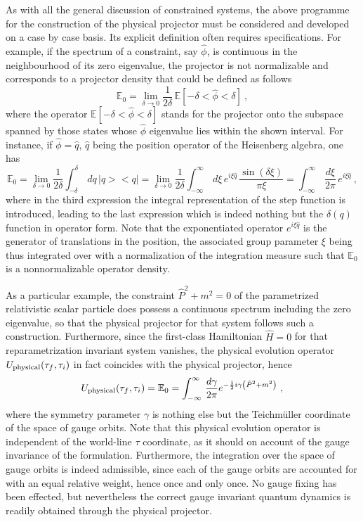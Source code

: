 \documentclass[a4paper,11pt]{article}
\def\proj{\mathbb E}
\begin{document}
As with all the general discussion of constrained systems, the above
programme for the construction of the physical projector must be
considered and developed on a case by case basis. Its explicit definition
often requires specifications. For example,\cite{Klaud1} if the spectrum 
of a constraint,
say $\hat{\phi}$, is continuous in the neighbourhood of its zero eigenvalue,
the projector is not normalizable and corresponds to a projector density
that could be defined as follows
\begin{equation}
\proj_0=\lim_{\delta\rightarrow 0}\frac{1}{2\delta}\,
\proj[-\delta<\hat{\phi}<\delta]\ ,
\end{equation}
where the operator $\proj[-\delta<\hat{\phi}<\delta]$ stands for the
projector onto the subspace spanned by those states whose $\hat{\phi}$
eigenvalue lies within the shown interval. For instance, 
if $\hat{\phi}=\hat{q}$, $\hat{q}$ being the position operator of the
Heisenberg algebra, one has
\begin{equation}
\proj_0=\lim_{\delta\rightarrow 0}\frac{1}{2\delta}\int_{-\delta}^\delta\,
dq\,|q><q|=\lim_{\delta\rightarrow 0}\frac{1}{2\delta}
\int_{-\infty}^\infty\,d\xi\,e^{i\xi\hat{q}}\,\frac{\sin(\delta\xi)}{\pi\xi}
=\int_{-\infty}^\infty\,\frac{d\xi}{2\pi}\,e^{i\xi\hat{q}}\ ,
\end{equation}
where in the third expression the integral representation of the step
function is introduced, leading to the last expression which is indeed
nothing but the $\delta(q)$ function in operator form. Note that the
exponentiated operator $e^{i\xi\hat{q}}$ is the generator of
translations in the position, the associated group parameter $\xi$ being thus
integrated over with a normalization of the integration measure such that
$\proj_0$ is a nonnormalizable operator density.

As a particular example, the constraint $\hat{P}^2+m^2=0$ of the parametrized
relativistic scalar particle does possess a continuous spectrum including
the zero eigenvalue, so that the physical projector for that system
follows such a construction. Furthermore, since the first-class Hamiltonian
$\hat{H}=0$ for that reparametrization invariant system vanishes, the
physical evolution operator $U_{\rm physical}(\tau_f,\tau_i)$ in fact
coincides with the physical projector, hence
\begin{equation}
U_{\rm physical}(\tau_f,\tau_i)=\proj_0=\int_{-\infty}^\infty\,
\frac{d\gamma}{2\pi}e^{-\frac{1}{2}i\gamma\left(\hat{P}^2+m^2\right)}\ ,
\end{equation}
where the symmetry parameter $\gamma$ is nothing else but the
Teichm\"uller coordinate of the space of gauge orbits. Note that this
physical evolution operator is independent of the world-line $\tau$
coordinate, as it should on account of the gauge invariance
of the formulation. Furthermore, the integration over the space of gauge
orbits is indeed admissible, since each of the gauge orbits are accounted
for with an equal relative weight, hence once and only once. No gauge fixing
has been effected, but nevertheless the correct gauge invariant quantum
dynamics is readily obtained through the physical projector.
\end{document}
